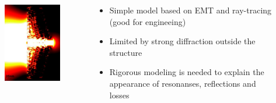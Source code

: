\documentclass{beamer}
\begin{document}
\begin{frame}
\begin{columns}
\begin{column}{0.5\textwidth}
\begin{figure}
				\includegraphics[angle=90,width=\textwidth]{../images/multilayer/konc_ene_mgr.png}
			\end{figure}
		\end{column}
		\begin{column}{0.5\textwidth}
			\begin{itemize}
				\item Simple model based on EMT and ray-tracing (good for engineeing)
				\item Limited by strong diffraction outside the structure
				\item Rigorous modeling is needed to explain the appearance of resonanses, reflections and losses
			\end{itemize}
		
		\end{column}
	\end{columns}
		
\end{frame}
\end{document}
